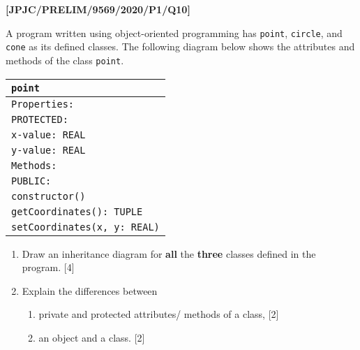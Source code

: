 \item \textbf{{[}JPJC/PRELIM/9569/2020/P1/Q10{]} }

A program written using object-oriented programming has \texttt{point},
\texttt{circle}, and \texttt{cone} as its defined classes. The following
diagram below shows the attributes and methods of the class \texttt{point}. 
\noindent \begin{center}
\texttt{}%
\begin{tabular}{|l|}
\hline 
\texttt{point }\tabularnewline
\hline 
\hline 
\texttt{Properties: }\tabularnewline
\hline 
\texttt{PROTECTED: }\tabularnewline
\texttt{x-value: REAL }\tabularnewline
\texttt{y-value: REAL }\tabularnewline
\hline 
\texttt{Methods: }\tabularnewline
\hline 
\texttt{PUBLIC: }\tabularnewline
\texttt{constructor() }\tabularnewline
\texttt{getCoordinates(): TUPLE }\tabularnewline
\texttt{setCoordinates(x, y: REAL)}\tabularnewline
\hline 
\end{tabular}
\par\end{center}
\begin{enumerate}
\item Draw an inheritance diagram for \textbf{all} the \textbf{three} classes
defined in the program. \hfill{}{[}4{]}
\item Explain the differences between 
\begin{enumerate}
\item private and protected attributes/ methods of a class, \hfill{}{[}2{]}
\item an object and a class. \hfill{}{[}2{]}
\end{enumerate}
\end{enumerate}